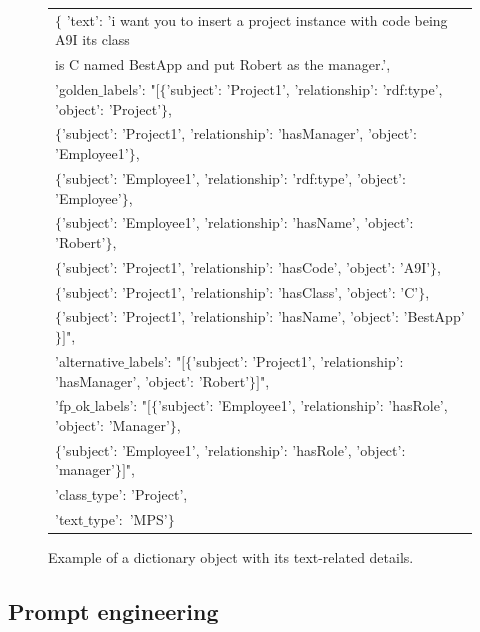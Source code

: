 \documentclass[runningheads]{llncs}
\begin{document}
\begin{figure}[!tb]
\scriptsize
\begin{tabular}{|p{12cm}|}
\hline
$\{$ 
 'text': 'i want you to insert a project instance with code being A9I its class \\
\quad\quad\quad\quad		is C named BestApp and put Robert as the manager.', \\
 'golden$\_$labels': "$[\{$'subject': 'Project1', 'relationship': 'rdf:type', 'object': 'Project'$\}$, \\
\qquad\qquad\qquad  $\{$'subject': 'Project1', 'relationship': 'hasManager', 'object': 'Employee1'$\}$, \\
\qquad\qquad\qquad  $\{$'subject': 'Employee1', 'relationship': 'rdf:type', 'object': 'Employee'$\}$, \\
\qquad\qquad\qquad  $\{$'subject': 'Employee1', 'relationship': 'hasName', 'object': 'Robert'$\}$, \\
\qquad\qquad\qquad	$\{$'subject': 'Project1', 'relationship': 'hasCode', 'object': 'A9I'$\}$, \\
\qquad\qquad\qquad  $\{$'subject': 'Project1', 'relationship': 'hasClass', 'object': 'C'$\}$, \\
\qquad\qquad\qquad  $\{$'subject': 'Project1', 'relationship': 'hasName', 'object': 'BestApp'$\}]$", \\
 'alternative$\_$labels': "$[\{$'subject': 'Project1', 'relationship': 'hasManager', 'object': 'Robert'$\}]$",\\
 'fp$\_$ok$\_$labels': "$[\{$'subject': 'Employee1', 'relationship': 'hasRole', 'object': 'Manager'$\}$, \\
 \qquad\qquad\qquad $\{$'subject': 'Employee1', 'relationship': 'hasRole', 'object': 'manager'$\}]$", \\
 'class$\_$type': 'Project',\\
 'text$\_$type': 'MPS'$\}$\\
\hline
\end{tabular}
\caption{Example of a dictionary object with its text-related details.}%
\label{fig:dictionary}%
\end{figure}





\subsection{Prompt engineering}
\end{document}
